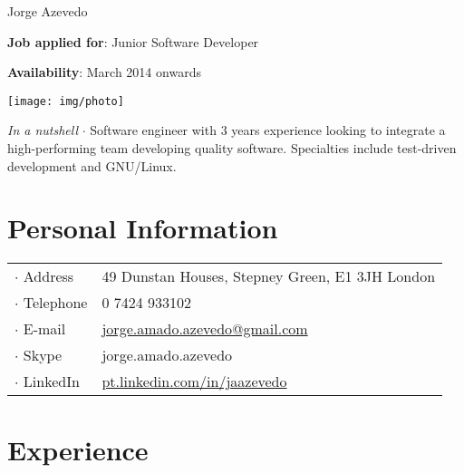



\topSection
{
	{\Huge Jorge Azevedo}

	\vspace{1.5mm}
	\vspace*{10mm}

	\textbf{Job applied for}: Junior Software Developer

	\textbf{Availability}: March 2014 onwards
} {
	\texttt{[image: img/photo]}
}

\emph{In a nutshell} $\cdot$ Software engineer with 3 years experience looking
to integrate a high-performing team developing quality software. Specialties
include test-driven development and GNU/Linux.

\section*{Personal Information}

{
\begin{tabular}[t]{@{}l l}
	$\cdot$  Address & 49 Dunstan Houses, Stepney Green, E1 3JH London \\
	$\cdot$  Telephone & 0 7424 933102 \\
	$\cdot$  E-mail & \href{mailto:jorge.amado.azevedo@gmail.com}{jorge.amado.azevedo@gmail.com} \\
	$\cdot$  Skype & jorge.amado.azevedo\\
	$\cdot$  LinkedIn & \href{http://pt.linkedin.com/in/jaazevedo}{pt.linkedin.com/in/jaazevedo}\\
\end{tabular}
}

\section*{Experience}


